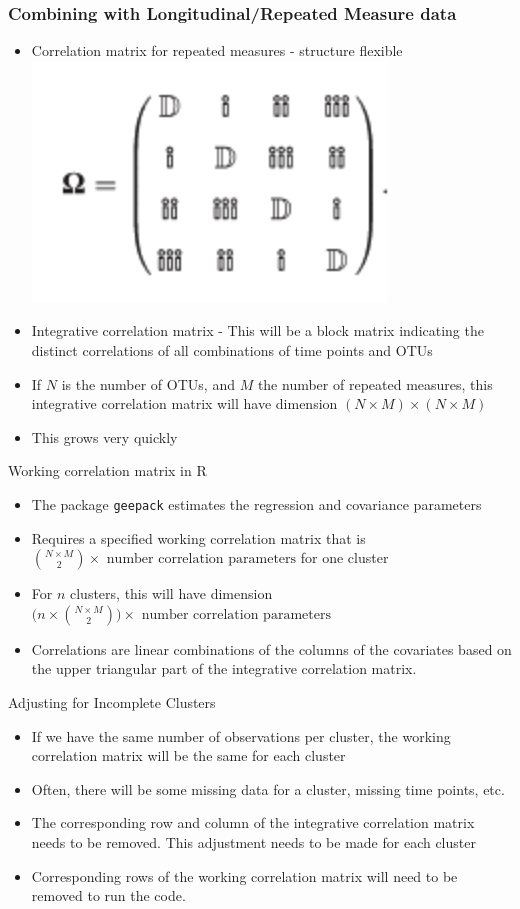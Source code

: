 \documentclass{beamer}
\begin{document}
\begin{frame}
  \frametitle{Combining with Longitudinal/Repeated Measure data}
  \begin{itemize}
    \item Correlation matrix for repeated measures - structure flexible
    \includegraphics[width = .3\textwidth]{twin_omega.png}
    \item Integrative correlation matrix - This will be a block matrix indicating the distinct correlations of all combinations of time points and OTUs
    \item If $N$ is the number of OTUs, and $M$ the number of repeated measures, this integrative correlation matrix will have dimension $(N \times M) \times(N \times M)$
    \item This grows very quickly
  \end{itemize}
\end{frame}


\begin{frame}[t]{Working correlation matrix in R}
  \begin{itemize}
    \item The package \texttt{geepack} estimates the regression and covariance parameters
    \item Requires a specified working correlation matrix that is $\binom{N \times M}{2} \times  \text{ number correlation parameters}$ for one cluster
    \item For $n$ clusters, this will have dimension $\bigg(n \times \binom{N \times M}{2}\bigg) \times  \text{ number correlation parameters}$
    \item Correlations are linear combinations of the columns of the covariates based on the upper triangular part of the integrative correlation matrix.
  \end{itemize}
\end{frame}

\begin{frame}[t]{Adjusting for Incomplete Clusters}
  \begin{itemize}
    \item If we have the same number of observations per cluster, the working correlation matrix will be the same for each cluster
    \item Often, there will be some missing data for a cluster, missing time points, etc.
    \item The corresponding row and column of the integrative correlation matrix needs to be removed. This adjustment needs to be made for each cluster
    \item Corresponding rows of the working correlation matrix will need to be removed to run the code.
  \end{itemize}
\end{frame}
\end{document}
